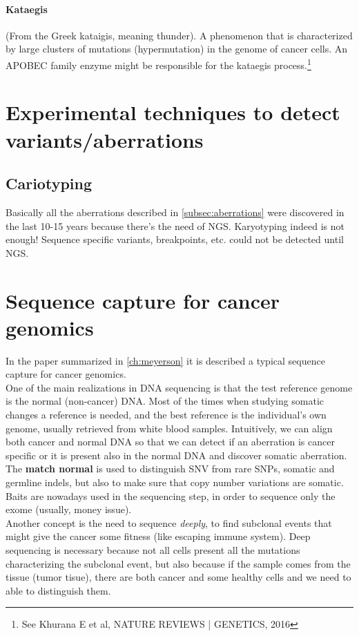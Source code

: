 			\paragraph*{Kataegis}
			 (From the Greek kataigis, meaning thunder).
A phenomenon that is characterized by large clusters of mutations (hypermutation) in
the genome of cancer cells. An APOBEC family enzyme might be responsible for the
kataegis process.\footnote{See  Khurana E et al, NATURE REVIEWS | GENETICS, 2016 }


\section{Experimental techniques to detect variants/aberrations}
\subsection{Cariotyping}
Basically all the aberrations described in \ref{subsec:aberrations} were discovered in the last 10-15 years because there's the need of NGS. 
Karyotyping indeed is not enough! 
Sequence specific variants, breakpoints, etc. could not be detected until NGS. 

\section{Sequence capture for cancer genomics}
In the paper summarized in \ref{ch:meyerson} it is described a typical sequence capture for cancer genomics. \\
One of the main realizations in DNA sequencing is that the test reference genome is the normal (non-cancer) DNA.
Most of the times when studying somatic changes a reference is needed, and the best reference is the individual's own genome, usually retrieved from white blood samples. 
Intuitively, we can align both cancer and normal DNA so that we can detect if an aberration is cancer specific or it is present also in the normal DNA and discover somatic aberration.
The \textbf{match normal} is used to distinguish SNV from rare SNPs, somatic and germline indels, but also to make sure that copy number variations are somatic. 
Baits are nowadays used in the sequencing step, in order to sequence only the exome (usually, money issue). \\

Another concept is the need to sequence \textit{deeply}, to find subclonal events that might give the cancer some fitness (like escaping immune system). Deep sequencing is necessary because not all cells present all the mutations characterizing the subclonal event, but also because if the sample comes from the tissue (tumor tisue), there are both cancer and some healthy cells and we need to able to distinguish them.


